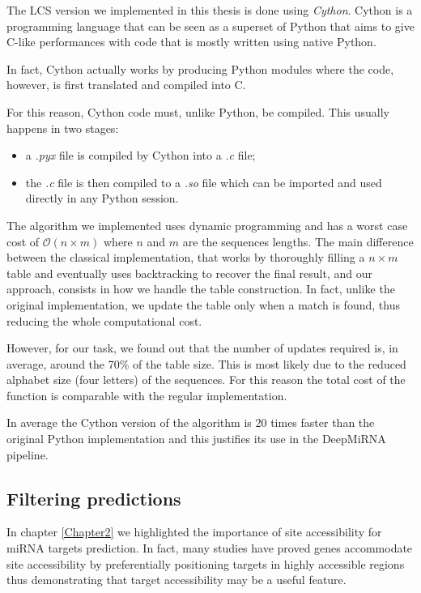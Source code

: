 The LCS version we implemented in this thesis is done using \emph{Cython}\cite{cython}. Cython is a programming language that can be seen as a superset of Python that aims to give C-like performances with code that is mostly written using native Python. 

In fact, Cython actually works by producing Python modules where the code, however, is first translated and compiled into C.

For this reason, Cython code must, unlike Python, be compiled. This usually happens in two stages: 

\begin{itemize}
	\item a \emph{.pyx} file is compiled by Cython into a \emph{.c} file;
	\item the \emph{.c} file is then compiled to a \emph{.so} file which can be imported and used directly in any Python session. 
\end{itemize}   

The algorithm we implemented uses dynamic programming and has a worst case cost of $\mathcal{O}(n \times m)$ where $n$ and $m$ are the sequences lengths. The main difference between the classical implementation, that works by thoroughly filling a $n \times m$ table and eventually uses  backtracking to recover the final result, and our approach, consists in how we handle the table construction. In fact, unlike the original implementation, we update the table only when a match is found, thus reducing the whole computational cost. 

However, for our task, we found out that the number of updates required is, in average, around the 70\% of the table size. This is most likely due to the reduced alphabet size (four letters) of the sequences. For this reason the total cost of the function is comparable with the regular implementation.

In average the Cython version of the algorithm is 20 times faster than the original Python implementation and this justifies its use in the DeepMiRNA pipeline.

      

\subsection{Filtering predictions} \label{sub:filtering_step}
In chapter \ref{Chapter2} we highlighted the importance of site accessibility for miRNA targets prediction. In fact, many studies \cite{helwak} \cite{common_features} have proved genes accommodate site accessibility by preferentially positioning targets in highly accessible regions \cite{accessibility_nrg_role} thus demonstrating that target accessibility may be a useful feature.

